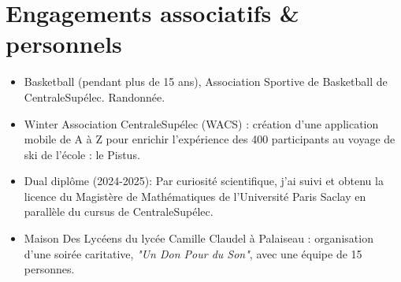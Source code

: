 \documentclass[a4paper,11pt]{article}
\begin{document}
\section*{Engagements associatifs \& personnels}
\begin{itemize}[leftmargin=*,noitemsep]
    \item Basketball (pendant plus de 15 ans), Association Sportive de Basketball de CentraleSupélec. Randonnée.
    \item Winter Association CentraleSupélec (WACS) : création d'une application mobile de A à Z pour enrichir l'expérience des 400 participants au voyage de ski de l'école : le Pistus.
    \item Dual diplôme (2024-2025): Par curiosité scientifique, j'ai suivi et obtenu la licence du Magistère de Mathématiques de l'Université Paris Saclay en parallèle du cursus de CentraleSupélec.
    \item Maison Des Lycéens du lycée Camille Claudel à Palaiseau : organisation d'une soirée caritative, \textit{"Un Don Pour du Son"}, avec une équipe de 15 personnes.
\end{itemize}

\end{document}
